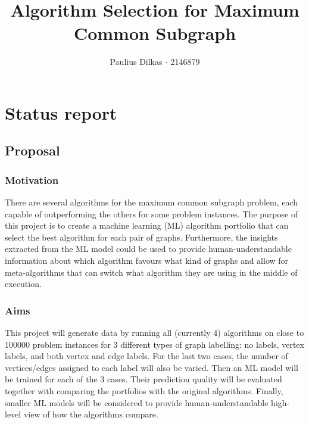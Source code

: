 \documentclass[11pt]{article}
\title{Algorithm Selection for Maximum Common Subgraph}
\author{Paulius Dilkas - 2146879}
\begin{document}
\maketitle

\section{Status report}

\subsection{Proposal}\label{proposal}

\subsubsection{Motivation}\label{motivation}


There are several algorithms for the maximum common subgraph problem, each
capable of outperforming the others for some problem instances. The purpose of
this project is to create a machine learning (ML) algorithm portfolio that can select
the best algorithm for each pair of graphs. Furthermore, the insights extracted
from the ML model could be used to provide human-understandable information
about which algorithm favours what kind of graphs and allow for meta-algorithms
that can switch what algorithm they are using in the middle of execution.

\subsubsection{Aims}\label{aims}


This project will generate data by running all (currently 4) algorithms on close
to 100000 problem instances for 3 different types of graph labelling: no labels,
vertex labels, and both vertex and edge labels. For the last two cases, the
number of vertices/edges assigned to each label will also be varied. Then an ML model
will be trained for each of the 3 cases. Their prediction quality will be
evaluated together with comparing the portfolios with the original algorithms.
Finally, smaller ML models will be considered to provide human-understandable
high-level view of how the algorithms compare.
\end{document}
